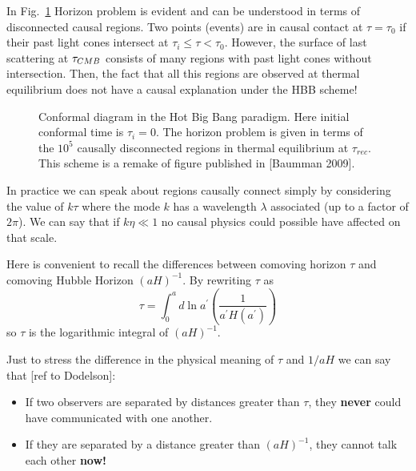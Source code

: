 \documentclass[12pt,letterpaper,twoside]{book}
\begin{document}
In Fig.~\ref{Fig:HBB_Conformal} Horizon problem is evident and can be understood
in terms of disconnected causal regions. Two points (events) are in causal
contact at $\tau=\tau_0$ if their past light cones intersect at $\tau_i \leq
\tau < \tau_0$.  However, the surface of last scattering at $\tau_{{\tiny CMB}}$
consists of many regions with past light cones without intersection. Then, the
fact that all this regions are observed at thermal equilibrium does not have a
causal explanation under the HBB scheme!

\begin{figure}[tb][tb]
    \begin{center}
        \resizebox{0.8\textwidth}{!}{}
        \caption{Conformal diagram in the Hot Big Bang paradigm. Here initial
            conformal time is $\tau_i = 0$. The horizon problem is given in
            terms of the $10^5$ causally disconnected regions in thermal
            equilibrium at $\tau_{rec}$. This scheme is a remake of figure
            published in [Baumman 2009]. }
        \label{Fig:HBB_Conformal}
    \end{center}
\end{figure}

In practice we can speak about regions causally connect simply by considering
the value of $k\tau$ where the mode $k$ has a wavelength $\lambda$ associated
(up to a factor of $2\pi$). We can say that if $ k \eta \ll 1$ no causal physics
could possible have affected on that scale.

Here is convenient to recall the differences between comoving horizon $\tau$
and comoving Hubble Horizon $(aH)^{-1}$. By rewriting  $\tau$ as
\begin{equation}
 \tau= \int_0^a d \ln a^\prime \left(  \frac{1}{a^\prime H\left( a^\prime\right)}  \right)
 \end{equation}
so $\tau$ is the logarithmic integral of $\left( aH\right)^{-1}$.

Just to stress the difference in the physical meaning of $\tau$ and $1/aH$  we
can say that [ref to Dodelson]:

\begin{itemize}
    \item
        If two observers are separated by distances greater than $\tau$, they
        \textbf{never} could have communicated with one another.
    \item
        If they are separated by a distance greater than $\left( aH\right)^{-1}$,
        they cannot talk each other \textbf{now!}
\end{itemize}
\end{document}
